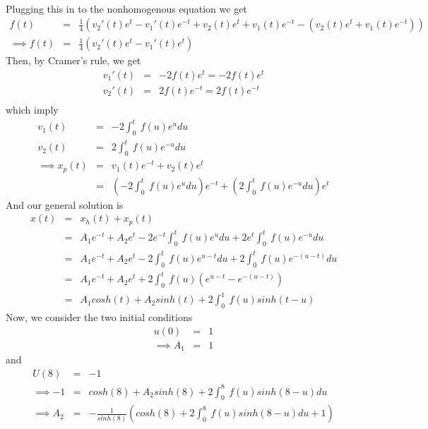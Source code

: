 \documentclass[11pt]{SelfArxOneColBMN}
\begin{document}
\begin{exercise}
\begin{solution}
\begin{eqnarray*}
    \end{eqnarray*}
    Plugging this in to the nonhomogenous equation we get
    \begin{eqnarray*}
      f(t) &=& \frac{1}{4}(v_2'(t)e^t - v_1'(t)e^{-t} + v_2(t)e^t + v_1(t)e^{-t} - (v_2(t)e^t + v_1(t)e^{-t}))\\
      \implies f(t) &=& \frac{1}{4}(v_2'(t)e^t - v_1'(t)e^t)
    \end{eqnarray*}
    Then, by Cramer's rule, we get
    \begin{eqnarray*}
      v_1'(t) &=& -2f(t)e^t = -2f(t)e^t\\
      v_2'(t) &=& 2f(t)e^{-t} = 2f(t)e^{-t}\\
    \end{eqnarray*}
    which imply
    \begin{eqnarray*}
      v_1(t) &=& -2\int_0^t\:f(u)e^udu\\
      v_2(t) &=& 2\int_0^t\:f(u)e^{-u}du\\
      \implies x_p(t) &=& v_1(t)e^{-t} + v_2(t)e^t\\
      &=& (-2\int_0^t\:f(u)e^udu)e^{-t} + (2\int_0^t\:f(u)e^{-u}du)e^t
    \end{eqnarray*}
    And our general solution is
    \begin{eqnarray*}
      x(t) &=& x_h(t) + x_p(t)\\
      &=& A_1e^{-t} + A_2e^t - 2e^{-t}\int_0^t\:f(u)e^udu + 2e^t\int_0^t\:f(u)e^{-u}du\\
      &=& A_1e^{-t} + A_2e^t - 2\int_0^t\:f(u)e^{u -t}du + 2\int_0^t\:f(u)e^{-(u -t)}du\\
      &=& A_1e^{-t} + A_2e^t + 2\int_0^t\:f(u)(e^{u - t} - e^{-(u - t)})\\
      &=& A_1cosh(t) + A_2sinh(t) + 2\int_0^1\:f(u)sinh(t - u)
    \end{eqnarray*}
    Now, we consider the two initial conditions
    \begin{eqnarray*}
      u(0) &=& 1\\
      \implies A_1 &=& 1
    \end{eqnarray*}
    and
    \begin{eqnarray*}
      U(8) &=& - 1\\
      \implies -1 &=& cosh(8) + A_2sinh(8) + 2\int_0^8\:f(u)sinh(8 - u)du\\
      \implies A_2 &=& -\frac{1}{sinh(8)}(cosh(8) + 2\int_0^8\:f(u)sinh(8 - u)du + 1)
    \end{eqnarray*}
  \end{solution}
\end{exercise}
\end{document}
